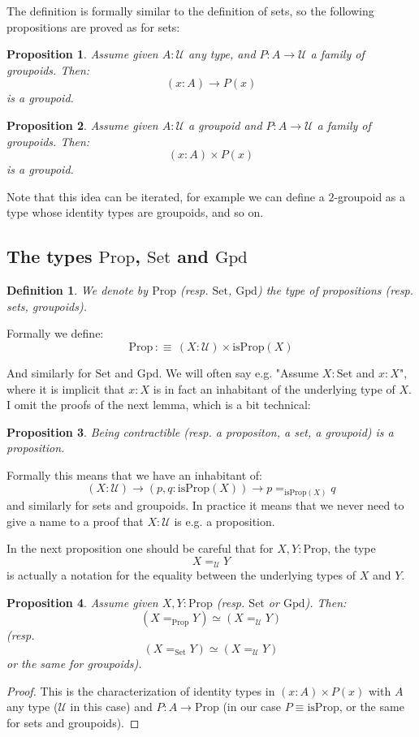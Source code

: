\documentclass{article}
\newcommand{\sse}[1]{\medbreak \subsection{#1}}
\newcommand{\U}{{\mathcal U}}
\renewcommand{\r}{\rightarrow}
\newcommand{\Set}{\mathrm{Set}}
\newcommand{\Prop}{\mathrm{Prop}}
\newcommand{\Gpd}{\mathrm{Gpd}}
\newtheorem{definition}{Definition}
\newtheorem{proposition}{Proposition}
\begin{document}
The definition is formally similar to the definition of sets, so the following propositions are proved as for sets:

\begin{proposition}
Assume given $A:\U$ any type, and $P:A\r \U$ a family of groupoids. Then:
\[(x:A)\r P(x)\]
is a groupoid.
\end{proposition}

\begin{proposition}
Assume given $A:\U$ a groupoid and $P:A\r \U$ a family of groupoids. Then:
\[(x:A)\times P(x)\]
is a groupoid.
\end{proposition}

 Note that this idea can be iterated, for example we can define a $2$-groupoid as a type whose identity types are groupoids, and so on.




\sse{The types $\Prop$, $\Set$ and $\Gpd$}

\begin{definition}
We denote by $\Prop$ (resp. $\Set$, $\Gpd$) the type of propositions (resp. sets, groupoids).%
\end{definition}

Formally we define:
\[\Prop \, :\equiv\, (X:\U)\times \mathrm{isProp}(X)\]

And similarly for $\Set$ and $\Gpd$. We will often say e.g. "Assume $X:\Set$ and $x:X$", where it is implicit that $x:X$ is in fact an inhabitant of the underlying type of $X$. I omit the proofs of the next lemma, which is a bit technical:

\begin{proposition}
Being contractible (resp. a propositon, a set, a groupoid) is a proposition.
\end{proposition}

Formally this means that we have an inhabitant of:
\[(X:\U)\r (p,q:\mathrm{isProp}(X)) \r p=_{\mathrm{isProp}(X)} q\] 
and similarly for sets and groupoids. In practice it means that we never need to give a name to a proof that $X:\U$ is e.g. a proposition.

In the next proposition one should be careful that for $X,Y:\Prop$, the type 
\[X=_\U Y\] 
is actually a notation for the equality between the underlying types of $X$ and $Y$.%

\begin{proposition}
Assume given $X,Y:\Prop$ (resp. $\Set$ or $\Gpd$). Then:
\[(X=_\Prop Y) \simeq (X=_\U Y)\]
(resp. 
\[(X=_\Set Y) \simeq (X=_\U Y)\]
or the same for groupoids).
\end{proposition}
\begin{proof}
This is the characterization of identity types in $(x:A)\times P(x)$ with $A$ any type ($\U$ in this case) and $P:A\r \Prop$ (in our case $P\equiv\mathrm{isProp}$, or the same for sets and groupoids). %
\end{proof}
\end{document}
